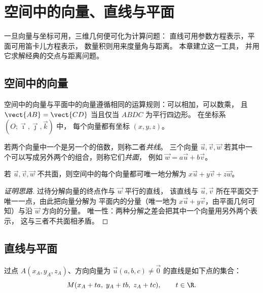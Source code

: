 \chapter{空间中的向量、直线与平面}\label{ch:g12:space}

一旦向量与坐标可用，三维几何便可化为计算问题：
直线可用参数方程表示，平面可用笛卡儿方程表示，
数量积则用来度量角与距离。
本章建立这一工具，
并用它求解经典的交点与距离问题。

\section{空间中的向量}

空间中的向量与平面中的向量遵循相同的运算规则：可以相加，可以数乘，
且 $\vect{AB} = \vect{CD}$ 当且仅当 $ABDC$ 为平行四边形。
在坐标系 $(O; \vec\imath, \vec\jmath, \vec k)$ 中，
每个向量都有坐标 $(x, y, z)$。

\begin{definition}[共线与共面]\label{def:g12:space:collinear}
若两个向量中一个是另一个的倍数，则称二者\emph{共线}。
三个向量 $\vec u, \vec v, \vec w$ 若其中一个可以写成另外两个的组合，则称它们\emph{共面}，
例如
$\vec w = a\vec u + b\vec v$。
\end{definition}

\begin{proposition}\label{prop:g12:space:basis}
若 $\vec u, \vec v, \vec w$ 不共面，则空间中的每个向量都可唯一地分解为
$x\vec u + y\vec v + z\vec w$。
\end{proposition}

\begin{proof}[证明思路]
过待分解向量的终点作与 $\vec w$ 平行的直线，
该直线与 $\vec u, \vec v$ 所在平面交于唯一一点，由此把向量分解为
平面内的分量（唯一地为 $x\vec u + y\vec
v$，由平面几何可知）与沿 $\vec w$ 方向的分量。
唯一性：两种分解之差会把其中一个向量用另外两个表示，
这与三者不共面相矛盾。
\end{proof}

\section{直线与平面}

\begin{definition}[直线的参数方程]\label{def:g12:space:line}
过点 $A(x_A, y_A, z_A)$、方向向量为
$\vec u (a, b, c) \neq \vec 0$ 的直线是如下点的集合：
\[
M(x_A + ta,\; y_A + tb,\; z_A + tc), \qquad t \in \R .
\]
\end{definition}

